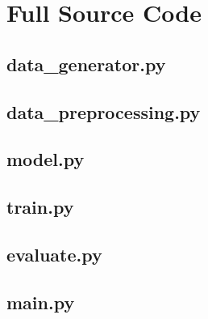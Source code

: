 \documentclass[11pt]{article}
\begin{document}
\appendix
\section{Full Source Code}

\subsection{data\_generator.py}


\subsection{data\_preprocessing.py}


\subsection{model.py}


\subsection{train.py}


\subsection{evaluate.py}


\subsection{main.py}

\end{document}
